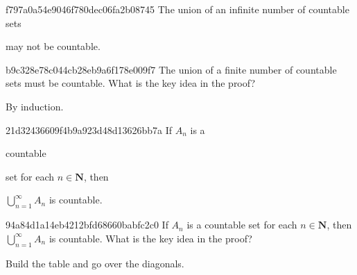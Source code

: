 \begin{note}{f797a0a54e9046f780dec06fa2b08745}
    The union of an infinite number of countable sets \begin{icloze}{1}may not be countable.\end{icloze}
\end{note}

\begin{note}{b9c328e78c044cb28eb9a6f178e009f7}
    The union of a finite number of countable sets must be countable.
    What is the key idea in the proof?

    \begin{cloze}{1}
        By induction.
    \end{cloze}
\end{note}

\begin{note}{21d32436609f4b9a923d48d13626bb7a}
    If \({ A_n }\) is a \begin{icloze}{2}countable\end{icloze} set for each \({ n \in \mathbf{N} }\), then \begin{icloze}{1}\({ \bigcup_{n=1}^{\infty}A_n }\) is countable.\end{icloze}
\end{note}

\begin{note}{94a84d1a14eb4212bfd68660babfc2c0}
    If \({ A_n }\) is a countable set for each \({ n \in \mathbf{N} }\), then \({ \bigcup_{n=1}^{\infty}A_n }\) is countable.
    What is the key idea in the proof?

    \begin{cloze}{1}
        Build the table and go over the diagonals.
    \end{cloze}
\end{note}


